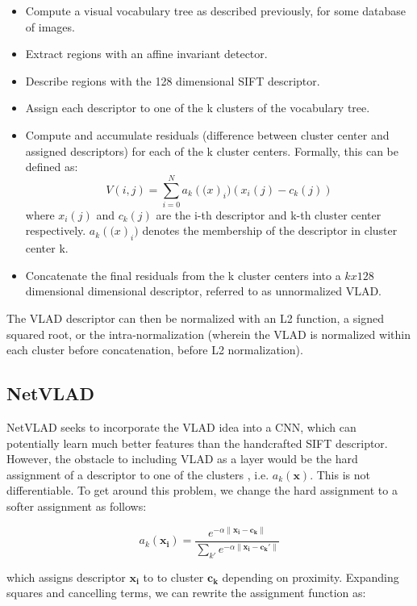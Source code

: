 \begin{itemize}
	\item Compute a visual vocabulary tree as described previously, for some database of images. \\
	\item Extract regions with an affine invariant detector.\\
	\item Describe regions with the 128 dimensional SIFT descriptor. \\
	\item Assign each descriptor to one of the k clusters of the vocabulary tree.\\
	\item Compute and accumulate residuals (difference between cluster center and assigned descriptors) for each of the k cluster centers. Formally, this can
	be defined as:
	\[V(i, j) = \sum_{i=0}^{N}a_k(\mathcal(x)_i)(x_i(j) - c_k(j))\]
	where $x_i(j)$ and $c_k(j)$ are the i-th descriptor and k-th cluster center respectively. $a_k(\mathcal(x)_i)$ denotes the membership of the descriptor in 
	cluster center k.\\
	\item Concatenate the final residuals from the k cluster centers into a $k x 128$ dimensional dimensional descriptor, referred to as unnormalized VLAD.
\end{itemize}

The VLAD descriptor can then be normalized with an L2 function, a signed squared root, or the intra-normalization (wherein the VLAD is normalized within each 
cluster before concatenation, before L2 normalization).

\subsection{NetVLAD}
NetVLAD seeks to incorporate the VLAD idea into a CNN, which can potentially learn much better features than the handcrafted SIFT descriptor. However, the 
obstacle to including VLAD as a layer would be the hard assignment of a descriptor to one of the clusters , i.e. $a_k(\mathbf{x})$. This is not differentiable. 
To get around this problem, we change the hard assignment to a softer assignment as follows:

\[a_k(\mathbf{x_i}) = \frac{e^{-\alpha\|\mathbf{x_i - c_k}\|}}{\sum_{k'}e^{-\alpha\|\mathbf{x_i - c_k'}\|}}\]

which assigns descriptor $\mathbf{x_i}$ to to cluster $\mathbf{c_k}$ depending on proximity. Expanding squares and cancelling terms, we can rewrite the assignment
function as:

